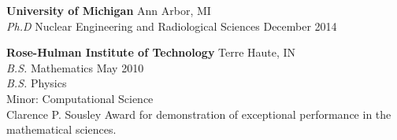 \documentclass[margin, 10pt]{res} %
\begin{document}
\begin{resume}
\textbf{University of Michigan} \hfill Ann Arbor, MI \\
{\sl Ph.D} Nuclear Engineering and Radiological Sciences \hfill December 2014


\textbf{Rose-Hulman Institute of Technology} \hfill Terre Haute, IN \\
{\sl B.S.} Mathematics \hfill May 2010 \\
{\sl B.S.} Physics \\
Minor: Computational Science \\
Clarence P. Sousley Award for demonstration of exceptional performance in the mathematical sciences.
  
\end{resume}
\end{document}
